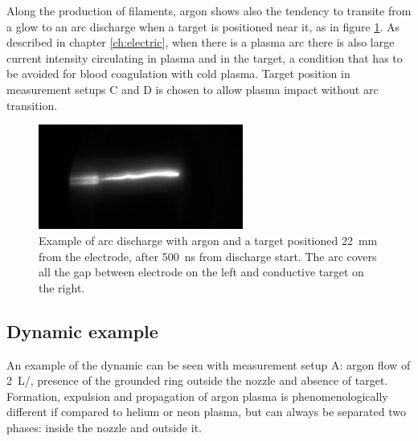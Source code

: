 Along the production of filaments, argon shows also the tendency to transite from a glow to an arc discharge when a target is positioned near it, as in figure \ref{fig:arcex}. As described in chapter \ref{ch:electric}, when there is a plasma arc there is also large current intensity circulating in plasma and in the target, a condition that has to be avoided for blood coagulation with cold plasma. Target position in measurement setups C and D is chosen to allow plasma impact without arc transition.
\begin{figure}
 \centering
 \includegraphics[width=0.6\textwidth]{Images/Shape/arcex.png}
 \caption{Example of arc discharge with argon and a target positioned \SI{22}{\milli\meter} from the electrode, after \SI{500}{\nano\second} from discharge start. The arc covers all the gap between electrode on the left and conductive target on the right.}
 \label{fig:arcex}
\end{figure}

\subsection{Dynamic example}
An example of the dynamic can be seen with measurement setup A: argon flow of \SI{2}{\liter/\min}, presence of the grounded ring outside the nozzle and absence of target.
Formation, expulsion and propagation of argon plasma is phenomenologically different if compared to helium or neon plasma, but can always be separated two phases: inside the nozzle and outside it.

